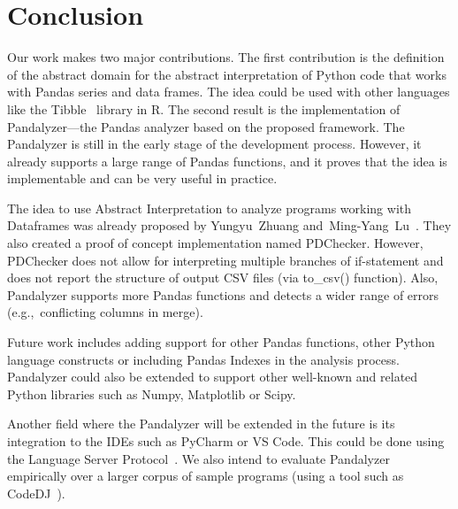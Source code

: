 \section{Conclusion}

Our work makes two major contributions.
The first contribution is the definition of the abstract domain for the abstract interpretation of Python code
that works with Pandas series and data frames.
The idea could be used with other languages like the Tibble~\cite{tibble} library in R\@.
The second result is the implementation of Pandalyzer---the Pandas analyzer based on the proposed framework.
The Pandalyzer is still in the early stage of the development process.
However, it already supports a large range of Pandas functions, and it proves that the idea is implementable and can be
very useful in practice.

The idea to use Abstract Interpretation to analyze programs working with Dataframes was already proposed
by Yungyu~Zhuang and~Ming-Yang~Lu~\cite{Zhuang:2022:TypeChecking}.
They also created a proof of concept implementation named PDChecker.
However, PDChecker does not allow for interpreting multiple branches of if-statement and does not report the structure
of output CSV files (via to\_csv() function).
Also, Pandalyzer supports more Pandas functions and detects a wider range of errors
(e.g.,\ conflicting columns in merge).

Future work includes adding support for other Pandas functions, other Python language constructs or including
Pandas Indexes in the analysis process.
Pandalyzer could also be extended to support other well-known and related Python libraries such as Numpy,
Matplotlib or Scipy.

Another field where the Pandalyzer will be extended in the future is its integration to the IDEs such as PyCharm or
VS Code.
This could be done using the Language Server Protocol~\cite{language_server_protocol}.
We also intend to evaluate Pandalyzer empirically over a larger corpus of sample programs
(using a tool such as CodeDJ~\cite{vakar2021causality}).
